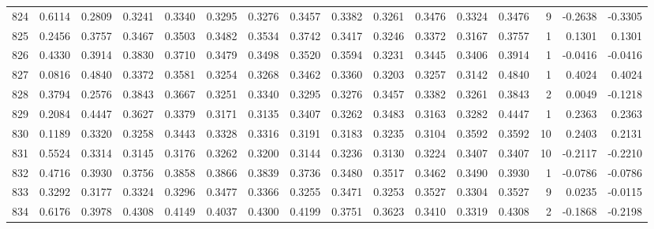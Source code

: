 \begin{tabular}{lrrrrrrrrrrrrrrr}
824 &      0.6114 &  0.2809 &  0.3241 &  0.3340 &  0.3295 &  0.3276 &  0.3457 &  0.3382 &  0.3261 &  0.3476 &   0.3324 &     0.3476 &      9 &                   -0.2638 &                    -0.3305 \\
825 &      0.2456 &  0.3757 &  0.3467 &  0.3503 &  0.3482 &  0.3534 &  0.3742 &  0.3417 &  0.3246 &  0.3372 &   0.3167 &     0.3757 &      1 &                    0.1301 &                     0.1301 \\
826 &      0.4330 &  0.3914 &  0.3830 &  0.3710 &  0.3479 &  0.3498 &  0.3520 &  0.3594 &  0.3231 &  0.3445 &   0.3406 &     0.3914 &      1 &                   -0.0416 &                    -0.0416 \\
827 &      0.0816 &  0.4840 &  0.3372 &  0.3581 &  0.3254 &  0.3268 &  0.3462 &  0.3360 &  0.3203 &  0.3257 &   0.3142 &     0.4840 &      1 &                    0.4024 &                     0.4024 \\
828 &      0.3794 &  0.2576 &  0.3843 &  0.3667 &  0.3251 &  0.3340 &  0.3295 &  0.3276 &  0.3457 &  0.3382 &   0.3261 &     0.3843 &      2 &                    0.0049 &                    -0.1218 \\
829 &      0.2084 &  0.4447 &  0.3627 &  0.3379 &  0.3171 &  0.3135 &  0.3407 &  0.3262 &  0.3483 &  0.3163 &   0.3282 &     0.4447 &      1 &                    0.2363 &                     0.2363 \\
830 &      0.1189 &  0.3320 &  0.3258 &  0.3443 &  0.3328 &  0.3316 &  0.3191 &  0.3183 &  0.3235 &  0.3104 &   0.3592 &     0.3592 &     10 &                    0.2403 &                     0.2131 \\
831 &      0.5524 &  0.3314 &  0.3145 &  0.3176 &  0.3262 &  0.3200 &  0.3144 &  0.3236 &  0.3130 &  0.3224 &   0.3407 &     0.3407 &     10 &                   -0.2117 &                    -0.2210 \\
832 &      0.4716 &  0.3930 &  0.3756 &  0.3858 &  0.3866 &  0.3839 &  0.3736 &  0.3480 &  0.3517 &  0.3462 &   0.3490 &     0.3930 &      1 &                   -0.0786 &                    -0.0786 \\
833 &      0.3292 &  0.3177 &  0.3324 &  0.3296 &  0.3477 &  0.3366 &  0.3255 &  0.3471 &  0.3253 &  0.3527 &   0.3304 &     0.3527 &      9 &                    0.0235 &                    -0.0115 \\
834 &      0.6176 &  0.3978 &  0.4308 &  0.4149 &  0.4037 &  0.4300 &  0.4199 &  0.3751 &  0.3623 &  0.3410 &   0.3319 &     0.4308 &      2 &                   -0.1868 &                    -0.2198 \\

\end{tabular}
